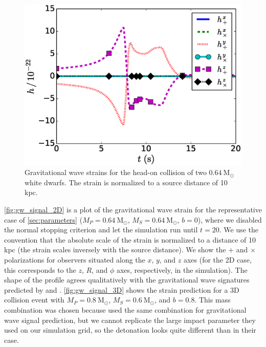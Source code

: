 \documentclass[twocolumn,numberedappendix]{../aastex6}
\newcommand{\msolar}{\mathrm{M}_\odot}
\begin{document}
\begin{figure}
  \centering
  \includegraphics[scale=0.425]{plots/gw_signal_2D}
  \caption{Gravitational wave strains for the head-on collision of two $0.64\ \msolar$
           white dwarfs. The strain is normalized to a source distance of 10 kpc.
           \label{fig:gw_signal_2D}}
\end{figure}

\autoref{fig:gw_signal_2D} is a plot of the gravitational wave strain for
the representative case of \autoref{sec:parameters} ($M_P = 0.64\ \msolar$, $M_S = 0.64\ \msolar$, $b = 0$),
where we disabled the normal stopping criterion and let the simulation run until $t = 20$.
We use the convention that the absolute scale of the strain is normalized to a distance
of 10 kpc (the strain scales inversely with the source distance). We show the $+$ and $\times$
polarizations for observers situated along the $x$, $y$, and $z$ axes (for the 2D case,
this corresponds to the $z$, $R$, and $\phi$ axes, respectively, in the simulation).
The shape of the profile agrees qualitatively with the gravitational wave signatures
predicted by \cite{loren-aguilar:2009:collisions} and \cite{garcia-senz:2013}.
\autoref{fig:gw_signal_3D} shows the strain prediction for a 3D collision event
with $M_P = 0.8\ \msolar$, $M_S = 0.6\ \msolar$, and $b = 0.8$. This mass combination
was chosen because \cite{loren-aguilar:2009:collisions} used the same combination for
gravitational wave signal prediction, but we cannot replicate the large impact parameter
they used on our simulation grid, so the detonation looks quite different than in their case.
\end{document}
